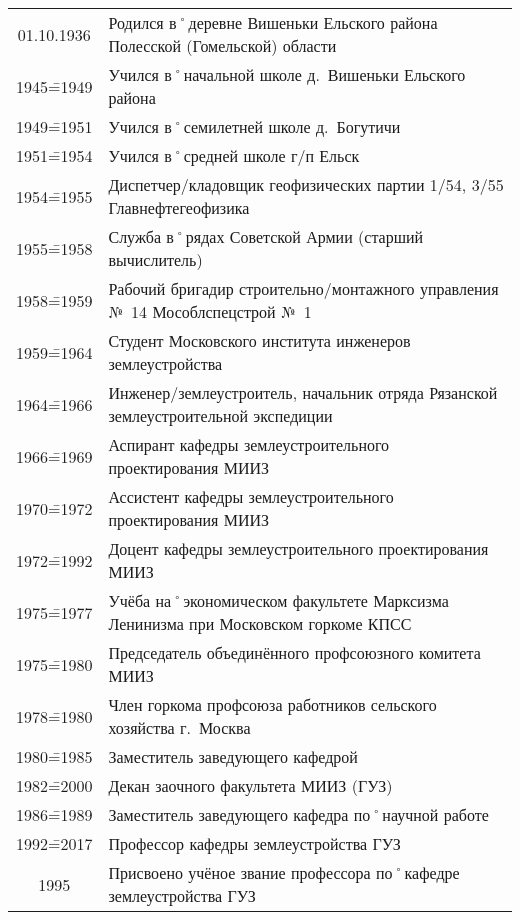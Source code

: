 \begin{table}[t]
{\small
	\begin{tabularx}{\textwidth}{cX}
		01.10.1936	&	Родился в˚деревне Вишеньки Ельского района Полесской (Гомельской) области			\\
		1945\==1949		&	Учился в˚начальной школе д.~Вишеньки Ельского района								\\
		1949\==1951		&	Учился в˚семилетней школе д.~Богутичи												\\
		1951\==1954		&	Учился в˚средней школе г/п Ельск													\\
		1954\==1955		&	Диспетчер\-/кладовщик геофизических партии 1/54, 3/55 Главнефтегеофизика				\\
		1955\==1958		&	Служба в˚рядах Советской Армии (старший вычислитель)								\\
		1958\==1959		&	Рабочий бригадир строительно\-/монтажного управления №~14 Мособлспецстрой №~1		\\
		1959\==1964		&	Студент Московского института инженеров землеустройства							\\
		1964\==1966		&	Инженер\-/землеустроитель, начальник отряда Рязанской землеустроительной экспедиции	\\
		1966\==1969		&	Аспирант кафедры землеустроительного проектирования МИИЗ							\\
		1970\==1972		&	Ассистент кафедры землеустроительного проектирования МИИЗ							\\
		1972\==1992		&	Доцент кафедры землеустроительного проектирования МИИЗ								\\
		1975\==1977		&	Учёба на˚экономическом факультете Марксизма Ленинизма при Московском горкоме КПСС	\\
		1975\==1980		&	Председатель объединённого профсоюзного комитета МИИЗ								\\
		1978\==1980		&	Член горкома профсоюза работников сельского хозяйства г.~Москва						\\
		1980\==1985		&	Заместитель заведующего кафедрой													\\
		1982\==2000		&	Декан заочного факультета МИИЗ (ГУЗ)												\\
		1986\==1989		&	Заместитель заведующего кафедра по˚научной работе									\\
		1992\==2017		&	Профессор кафедры землеустройства ГУЗ												\\
		1995				&	Присвоено учёное звание профессора по˚кафедре землеустройства ГУЗ					\\

\end{tabularx}}
\end{table}
